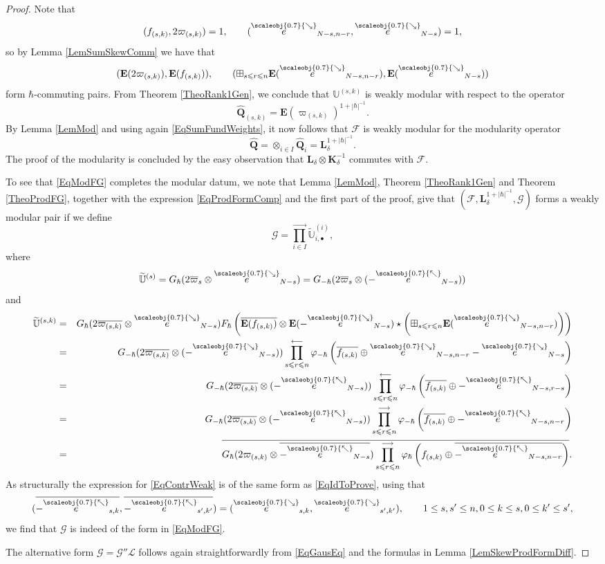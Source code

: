 \documentclass[11pt, reqno]{amsart}
\theoremstyle{definition}
\numberwithin{equation}{section}
\def\longra{\longrightarrow}
\def\longla{\longleftarrow}
\newcommand{\hr}[1]{\left(#1\right)}                                                    %
\def\le{\leqslant}
\newcommand{\eb}{\mathbf{E}}
\newcommand{\Qb}{\mathbf{Q}}
\newcommand{\bbU}{\mathbb{U}}
\newcommand{\Fct}{\mathcal{F}}
\newcommand{\tFct}{\mathcal{G}}
\newcommand{\tFctt}{\mathcal{G}''}
\newcommand{\tKc}{\mathcal L}
\newcommand{\sears}{\scaleobj{0.7}{\searrow}}
\newcommand{\nwars}{\scaleobj{0.7}{\nwarrow}}
\newcommand{\seee}{\overset{\sears}{e}}
\newcommand{\nwe}{\overset{\nwars}{e}}
\newcommand{\Kb}{\mathbf{K}}
\newcommand{\Lb}{\mathbf{L}}
\newcommand{\Ubb}{\mathbb{U}}
\newcommand{\wUbb}{\widetilde{\Ubb}}
\begin{document}
\begin{proof}
Note that
\[
(f_{(s,k)},2\varpi_{(s,k)}) = 1,\qquad (\seee_{N-s,n-r},\seee_{N-s}) = 1,
\]
so by Lemma \ref{LemSumSkewComm} we have that 
\[
(\eb(2\varpi_{(s,k)}),\eb(f_{(s,k)})),\qquad (\boxplus_{s \le r \le n} \eb(\seee_{N-s,n-r}),\eb(\seee_{N-s}))
\]
form $\hbar$-commuting pairs. From Theorem \ref{TheoRank1Gen}, we conclude  that $\bbU^{(s,k)}$ is weakly modular with respect to the operator
\[
\hat{\Qb}_{(s,k)} = \eb(\varpi_{(s,k)})^{1+|\hbar|^{-1}}.
\]
By Lemma \ref{LemMod} and using again \eqref{EqSumFundWeights}, it now follows that $\Fct$ is weakly modular for the modularity operator
\[
\hat{\Qb} = \otimes_{i \in I} \hat{\Qb}_i = \Lb_{\delta}^{1+|\hbar|^{-1}}.
\]
The proof of the modularity is concluded by the easy observation that $ \Lb_{\delta}\otimes \Kb_{\delta}^{-1}$ commutes with $\Fct$. 

To see that \eqref{EqModFG} completes the modular datum, we note that Lemma \ref{LemMod}, Theorem \ref{TheoRank1Gen} and Theorem \ref{TheoProdFG}, together with the expression \eqref{EqProdFormComp} and the first part of the proof, give that $(\Fct,\Lb_{\delta}^{1+|\hbar|^{-1}},\tFct)$ forms a weakly modular pair if we define
\begin{equation}\label{EqContrWeak}
\tFct = \prod_{i\in I}^{\longra} \wUbb^{(i)}_{i,\bullet},
\end{equation}
where 
\[
\wUbb^{(s)} = G_{\hbar}(2\overline{\varpi}_s\otimes \seee_{N-s}) = G_{-\hbar}(2\overline{\varpi}_s\otimes(- \nwe_{N-s}))
\]
and
\begin{eqnarray*}
\wUbb^{(s,k)} &=& G_{\hbar}(2\overline{\varpi_{(s,k)}} \otimes \seee_{N-s}) F_{\hbar}\left(\overline{\eb(f_{(s,k)})} \otimes \eb(-\seee_{N-s})\star \left(\boxplus_{s \le r \le n} \eb(\seee_{N-s,n-r})\right)\right)\\
&=& G_{-\hbar}(2\overline{\varpi_{(s,k)}} \otimes (-\seee_{N-s}))  \prod_{s \le r \le n}^{\longla}   \varphi_{-\hbar}\hr{\overline{f_{(s,k)}}\oplus \seee_{N-s,n-r}-\seee_{N-s}}\\
&=& G_{-\hbar}(2\overline{\varpi_{(s,k)}} \otimes (-\nwe_{N-s}))  \prod_{s \le r \le n}^{\longla}   \varphi_{-\hbar}\hr{\overline{f_{(s,k)}}\oplus -\nwe_{N-s,r-s}}\\
&=& G_{-\hbar}(2\overline{\varpi_{(s,k)}} \otimes (-\nwe_{N-s}))  \prod_{s \le r \le n}^{\longra}   \varphi_{-\hbar}\hr{\overline{f_{(s,k)}}\oplus -\nwe_{N-s,n-r}}\\
&=& \overline{G_{\hbar}(2\varpi_{(s,k)} \otimes \overline{-\nwe_{N-s}})  \prod_{s \le r \le n}^{\longra}   \varphi_{\hbar}\hr{f_{(s,k)}\oplus \overline{-\nwe_{N-s,n-r}}}}.
\end{eqnarray*}
As structurally the expression for \eqref{EqContrWeak} is of the same form as \eqref{EqIdToProve}, using that 
\[
(\overline{-\nwe_{s,k}},\overline{-\nwe_{s',k'}}) = (\seee_{s,k},\seee_{s',k'}),\qquad 1\leq s,s'\leq n,0\leq k \leq s,0\leq k'\leq s',
\]
we find that $\tFct$ is indeed of the form in \eqref{EqModFG}.

The alternative form $\tFct = \tFctt \tKc$ follows again straightforwardly from \eqref{EqGausEq} and the formulas in Lemma \ref{LemSkewProdFormDiff}.
\end{proof}
\end{document}
